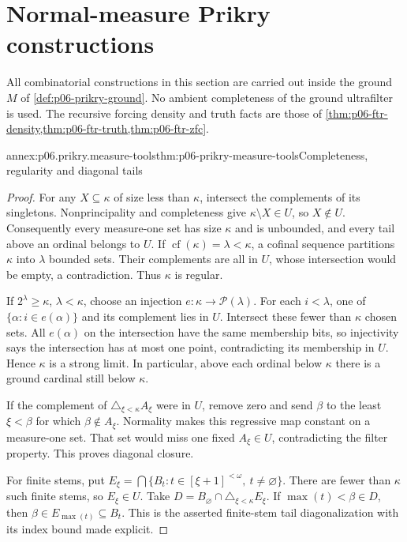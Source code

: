 \section{Normal-measure Prikry constructions}
\label{annex:p06-prikry-forcing-cofinality}

All combinatorial constructions in this section are carried out inside the
ground \(M\) of \cref{def:p06-prikry-ground}. No ambient completeness of
the ground ultrafilter is used. The recursive forcing density and truth
facts are those of \cref{thm:p06-ftr-density,thm:p06-ftr-truth,thm:p06-ftr-zfc}.

\begin{annexitem}{annex:p06.prikry.measure-tools}{thm:p06-prikry-measure-tools}{Completeness, regularity and diagonal tails}
\begin{proof}
For any \(X\subseteq\kappa\) of size less than \(\kappa\), intersect
the complements of its singletons. Nonprincipality and completeness give
\(\kappa\setminus X\in U\), so \(X\notin U\). Consequently every
measure-one set has size \(\kappa\) and is unbounded, and every tail
above an ordinal belongs to \(U\).
If \(\operatorname{cf}(\kappa)=\lambda<\kappa\), a cofinal sequence
partitions \(\kappa\) into \(\lambda\) bounded sets. Their complements
are all in \(U\), whose intersection would be empty, a contradiction.
Thus \(\kappa\) is regular.

If \(2^\lambda\geq\kappa\), \(\lambda<\kappa\), choose an injection
\(e:\kappa\to\mathcal P(\lambda)\). For each \(i<\lambda\), one of
\(\{\alpha:i\in e(\alpha)\}\) and its complement lies in \(U\).
Intersect these fewer than \(\kappa\) chosen sets. All \(e(\alpha)\)
on the intersection have the same membership bits, so injectivity says
the intersection has at most one point, contradicting its membership
in \(U\). Hence \(\kappa\) is a strong limit. In particular, above
each ordinal below \(\kappa\) there is a ground cardinal still below
\(\kappa\).

If the complement of \(\triangle_{\xi<\kappa}A_\xi\) were in \(U\),
remove zero and send \(\beta\) to the least \(\xi<\beta\) for which
\(\beta\notin A_\xi\). Normality makes this regressive map constant
on a measure-one set. That set would miss one fixed \(A_\xi\in U\),
contradicting the filter property. This proves diagonal closure.

For finite stems, put
\(E_\xi=\bigcap\{B_t:t\in[\xi+1]^{<\omega},\ t\ne\varnothing\}\).
There are fewer than \(\kappa\) such finite stems, so \(E_\xi\in U\).
Take \(D=B_{\varnothing}\cap\triangle_{\xi<\kappa}E_\xi\).
If \(\max(t)<\beta\in D\), then
\(\beta\in E_{\max(t)}\subseteq B_t\). This is the asserted finite-stem
tail diagonalization with its index bound made explicit.


\end{proof}
\end{annexitem}

